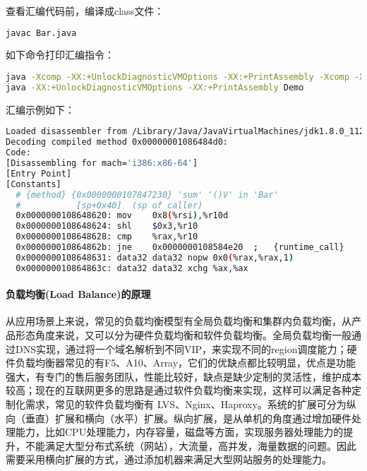 \documentclass[../../../interview-questions.tex]{subfiles}
\begin{document}
查看汇编代码前，编译成class文件：

\begin{lstlisting}[language=Bash]
javac Bar.java
\end{lstlisting}

如下命令打印汇编指令：

\begin{lstlisting}[language=Bash]
java -Xcomp -XX:+UnlockDiagnosticVMOptions -XX:+PrintAssembly -Xcomp -XX:CompileCommand=dontinline,Demo.sum -XX:CompileCommand=compileonly,Demo.sum Demo
java -XX:+UnlockDiagnosticVMOptions -XX:+PrintAssembly Demo
\end{lstlisting}

汇编示例如下：
 
\begin{lstlisting}[language=Bash]
Loaded disassembler from /Library/Java/JavaVirtualMachines/jdk1.8.0_112.jdk/Contents/Home/jre/lib/hsdis-amd64.dylib
Decoding compiled method 0x00000001086484d0:
Code:
[Disassembling for mach='i386:x86-64']
[Entry Point]
[Constants]
  # {method} {0x0000000107847230} 'sum' '()V' in 'Bar'
  #           [sp+0x40]  (sp of caller)
  0x0000000108648620: mov    0x8(%rsi),%r10d
  0x0000000108648624: shl    $0x3,%r10
  0x0000000108648628: cmp    %rax,%r10
  0x000000010864862b: jne    0x0000000108584e20  ;   {runtime_call}
  0x0000000108648631: data32 data32 nopw 0x0(%rax,%rax,1)
  0x000000010864863c: data32 data32 xchg %ax,%ax
\end{lstlisting}



\paragraph{负载均衡(Load Balance)的原理}

从应用场景上来说，常见的负载均衡模型有全局负载均衡和集群内负载均衡，从产品形态角度来说，又可以分为硬件负载均衡和软件负载均衡。全局负载均衡一般通过DNS实现，通过将一个域名解析到不同VIP，来实现不同的region调度能力；硬件负载均衡器常见的有F5、A10、Array，它们的优缺点都比较明显，优点是功能强大，有专门的售后服务团队，性能比较好，缺点是缺少定制的灵活性，维护成本较高；现在的互联网更多的思路是通过软件负载均衡来实现，这样可以满足各种定制化需求，常见的软件负载均衡有 LVS、Nginx、Haproxy。系统的扩展可分为纵向（垂直）扩展和横向（水平）扩展。纵向扩展，是从单机的角度通过增加硬件处理能力，比如CPU处理能力，内存容量，磁盘等方面，实现服务器处理能力的提升，不能满足大型分布式系统（网站），大流量，高并发，海量数据的问题。因此需要采用横向扩展的方式，通过添加机器来满足大型网站服务的处理能力。
\end{document}
